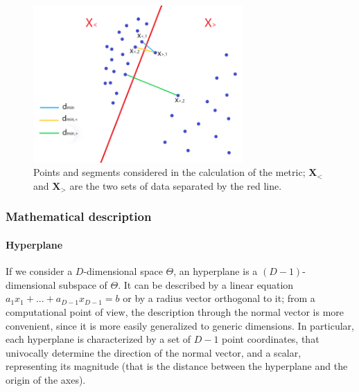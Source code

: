 \documentclass[a4paper]{article}
\begin{document}
\begin{figure}[H]
        \centering
        \includegraphics[width=8cm]{grafici/METRIC2.png}
\caption{Points and segments considered in the calculation of the metric; $\pmb{X}_<$ and $\pmb{X}_>$ are the two sets of data separated by the red line. }
\label{metric}
    \end{figure}   



\subsubsection*{Mathematical description}


\paragraph{Hyperplane} 

If we consider a $D$-dimensional space $\Theta$, an hyperplane is a $(D-1)$-dimensional subspace of $\Theta$.
It can be described by a linear equation $a_1 x_1 + ... + a_{D-1} x_{D-1} = b$ or by a radius vector orthogonal to it;
from a computational point of view, the description through the normal vector is more convenient, since it is more easily generalized to generic dimensions. 
In particular, each hyperplane is characterized by a set of $D-1$ point coordinates, that univocally determine the direction of the normal vector, and a scalar, representing its magnitude (that is the distance between the hyperplane and the origin of the axes).
\end{document}
